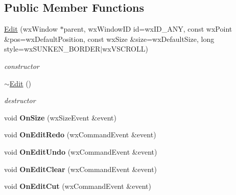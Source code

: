 \subsection*{Public Member Functions}
\begin{DoxyCompactItemize}
\item 
\hypertarget{class_edit_af83e3ad6078bdd00f0e5d8a6bce44e04}{\hyperlink{class_edit_af83e3ad6078bdd00f0e5d8a6bce44e04}{Edit} (wx\+Window $\ast$parent, wx\+Window\+I\+D id=wx\+I\+D\+\_\+\+A\+N\+Y, const wx\+Point \&pos=wx\+Default\+Position, const wx\+Size \&size=wx\+Default\+Size, long style=wx\+S\+U\+N\+K\+E\+N\+\_\+\+B\+O\+R\+D\+E\+R$\vert$wx\+V\+S\+C\+R\+O\+L\+L)}\label{class_edit_af83e3ad6078bdd00f0e5d8a6bce44e04}

\begin{DoxyCompactList}\small\item\em constructor \end{DoxyCompactList}\item 
\hypertarget{class_edit_a999416ba7b28de1d62c69aab8697606a}{\hyperlink{class_edit_a999416ba7b28de1d62c69aab8697606a}{$\sim$\+Edit} ()}\label{class_edit_a999416ba7b28de1d62c69aab8697606a}

\begin{DoxyCompactList}\small\item\em destructor \end{DoxyCompactList}\item 
\hypertarget{class_edit_a6b58abb4839a26010df91fabfdd34e76}{void {\bfseries On\+Size} (wx\+Size\+Event \&event)}\label{class_edit_a6b58abb4839a26010df91fabfdd34e76}

\item 
\hypertarget{class_edit_a54cd90b0450b676cbe8c3fee8ca56a2a}{void {\bfseries On\+Edit\+Redo} (wx\+Command\+Event \&event)}\label{class_edit_a54cd90b0450b676cbe8c3fee8ca56a2a}

\item 
\hypertarget{class_edit_ab5f41eb566e0c5ad039fce444bf0b739}{void {\bfseries On\+Edit\+Undo} (wx\+Command\+Event \&event)}\label{class_edit_ab5f41eb566e0c5ad039fce444bf0b739}

\item 
\hypertarget{class_edit_ac57c3eabcfe4b9b4b43c31e81c959e8c}{void {\bfseries On\+Edit\+Clear} (wx\+Command\+Event \&event)}\label{class_edit_ac57c3eabcfe4b9b4b43c31e81c959e8c}

\item 
\hypertarget{class_edit_a27aba2b8a97702245e8c8623ad67fe21}{void {\bfseries On\+Edit\+Cut} (wx\+Command\+Event \&event)}\label{class_edit_a27aba2b8a97702245e8c8623ad67fe21}


\end{DoxyCompactItemize}
